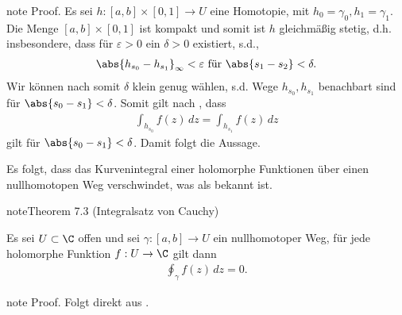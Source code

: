 \documentclass[letterpaper,10pt,german]{jupyterBook}
\begin{document}
\begin{sphinxadmonition}{note}
\sphinxAtStartPar
Proof. Es sei \(h:[a,b]\times[0,1]\to U\) eine Homotopie, mit \(h_0=\gamma_0, h_1=\gamma_1\). Die Menge \([a,b]\times[0,1]\) ist kompakt und somit ist \(h\) gleichmäßig stetig, d.h. insbesondere, dass für \(\varepsilon>0\) ein \(\delta >0\) existiert, s.d.,
\begin{equation*}
\begin{split}\abs{h_{s_0}-h_{s_1}}_\infty <\varepsilon \text{ für } \abs{s_1-s_2}< \delta.\end{split}
\end{equation*}
\sphinxAtStartPar
Wir können nach {\hyperref[\detokenize{complexanalysis/cauchyintegral:lem:closelem}]{}} somit \(\delta\) klein genug wählen, s.d. Wege \(h_{s_0}, h_{s_1}\) benachbart sind für \(\abs{s_0-s_1}<\delta\). Somit gilt nach {\hyperref[\detokenize{complexanalysis/cauchyintegral:lem:closepath}]{}}, dass
\begin{equation*}
\begin{split}\int_{h_{s_0}} f(z)\, dz = \int_{h_{s_1}} f(z)\, dz\end{split}
\end{equation*}
\sphinxAtStartPar
gilt für \(\abs{s_0-s_1}<\delta\). Damit folgt die Aussage.
\end{sphinxadmonition}

\sphinxAtStartPar
Es folgt, dass das Kurvenintegral einer holomorphe Funktionen über einen nullhomotopen Weg verschwindet, was als  bekannt ist.
\label{complexanalysis/cauchyintegral:theorem-7}
\begin{sphinxadmonition}{note}{Theorem 7.3 (Integralsatz von Cauchy)}



\sphinxAtStartPar
Es sei \(U\subset\C\) offen und sei \(\gamma:[a,b]\to U\) ein nullhomotoper Weg, für jede holomorphe Funktion \(f:U\to\C\) gilt dann
\begin{equation*}
\begin{split}\oint_\gamma f(z)\, dz = 0.\end{split}
\end{equation*}\end{sphinxadmonition}

\begin{sphinxadmonition}{note}
\sphinxAtStartPar
Proof. Folgt direkt aus {\hyperref[\detokenize{complexanalysis/cauchyintegral:lem:homotop}]{}}.
\end{sphinxadmonition}
\end{document}
